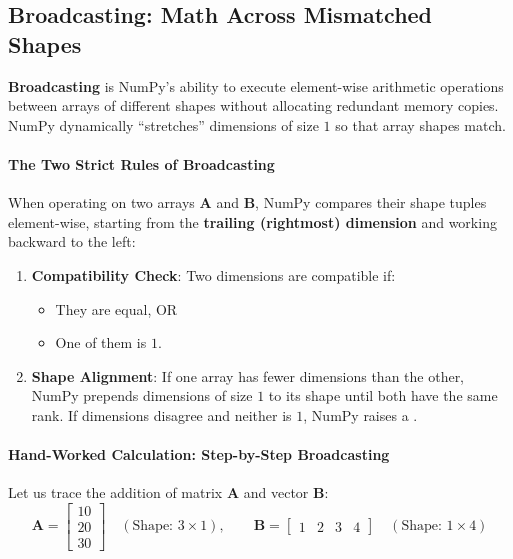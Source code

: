 \subsection{Broadcasting: Math Across Mismatched Shapes}

\begin{keyidea}
\textbf{Broadcasting} is NumPy's ability to execute element-wise arithmetic operations between arrays of different shapes without allocating redundant memory copies. NumPy dynamically ``stretches'' dimensions of size $1$ so that array shapes match.
\end{keyidea}

\paragraph{The Two Strict Rules of Broadcasting}
When operating on two arrays $\mathbf{A}$ and $\mathbf{B}$, NumPy compares their shape tuples element-wise, starting from the \textbf{trailing (rightmost) dimension} and working backward to the left:
\begin{enumerate}
    \item \textbf{Compatibility Check}: Two dimensions are compatible if:
    \begin{itemize}
        \item They are equal, OR
        \item One of them is $1$.
    \end{itemize}
    \item \textbf{Shape Alignment}: If one array has fewer dimensions than the other, NumPy prepends dimensions of size $1$ to its shape until both have the same rank. If dimensions disagree and neither is $1$, NumPy raises a .
\end{enumerate}

\paragraph{Hand-Worked Calculation: Step-by-Step Broadcasting}
Let us trace the addition of matrix $\mathbf{A}$ and vector $\mathbf{B}$:
\begin{equation*}
\mathbf{A} = \begin{bmatrix} 10 \\ 20 \\ 30 \end{bmatrix} \quad (\text{Shape: } 3 \times 1), \qquad \mathbf{B} = \begin{bmatrix} 1 & 2 & 3 & 4 \end{bmatrix} \quad (\text{Shape: } 1 \times 4)
\end{equation*}

